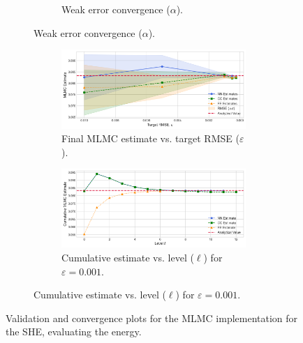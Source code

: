 \begin{figure}[htbp]
\begin{subfigure}{\textwidth}
\begin{subfigure}[b]{0.48\textwidth}
            \caption{Weak error convergence ($\alpha$).}
            \label{fig:mean_decay}
        \end{subfigure}
    \end{subfigure}
    \vspace{1cm}
    \begin{subfigure}{\textwidth}
        \centering
        \begin{subfigure}[b]{\textwidth}
            \centering
            \includegraphics[width=0.7\linewidth]{graphics/she_energy_conv.png}
            \caption{Final MLMC estimate vs. target RMSE ($\varepsilon$).}
            \label{fig:conv_vs_eps}
        \end{subfigure}
        \vspace{0.5cm}
        \begin{subfigure}[b]{\textwidth}
            \centering
            \includegraphics[width=0.7\linewidth]{graphics/she_energy_cumconv.png}
            \caption{Cumulative estimate vs. level ($\ell$) for $\varepsilon=0.001$.}
            \label{fig:cumulative_conv}
        \end{subfigure}
    \end{subfigure}
    \caption{Validation and convergence plots for the MLMC implementation for the SHE, evaluating
    the energy.}
    \label{fig:she_validation_combined}
\end{figure}
